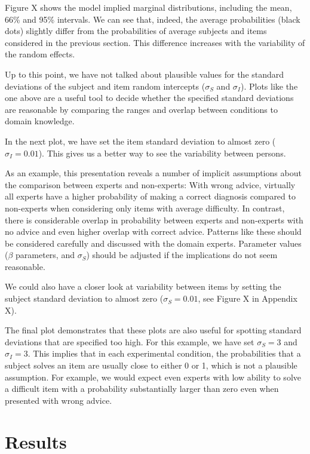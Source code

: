 \documentclass[
  man,floatsintext]{apa6}
\begin{document}
Figure X shows the model implied marginal distributions, including the mean, 66\% and 95\% intervals. We can see that, indeed, the average probabilities (black dots) slightly differ from the probabilities of average subjects and items considered in the previous section. This difference increases with the variability of the random effects.

Up to this point, we have not talked about plausible values for the standard deviations of the subject and item random intercepts (\(\sigma_S\) and \(\sigma_I\)). Plots like the one above are a useful tool to decide whether the specified standard deviations are reasonable by comparing the ranges and overlap between conditions to domain knowledge.

In the next plot, we have set the item standard deviation to almost zero (\(\sigma_I = 0.01\)). This gives us a better way to see the variability between persons.

As an example, this presentation reveals a number of implicit assumptions about the comparison between experts and non-experts: With wrong advice, virtually all experts have a higher probability of making a correct diagnosis compared to non-experts when considering only items with average difficulty. In contrast, there is considerable overlap in probability between experts and non-experts with no advice and even higher overlap with correct advice. Patterns like these should be considered carefully and discussed with the domain experts. Parameter values (\(\beta\) parameters, and \(\sigma_S\)) should be adjusted if the implications do not seem reasonable.

We could also have a closer look at variability between items by setting the subject standard deviation to almost zero (\(\sigma_S = 0.01\), see Figure X in Appendix X).

The final plot demonstrates that these plots are also useful for spotting standard deviations that are specified too high. For this example, we have set \(\sigma_S = 3\) and \(\sigma_I = 3\). This implies that in each experimental condition, the probabilities that a subject solves an item are usually close to either 0 or 1, which is not a plausible assumption. For example, we would expect even experts with low ability to solve a difficult item with a probability substantially larger than zero even when presented with wrong advice.

\hypertarget{results}{%
\section{Results}\label{results}}
\end{document}
